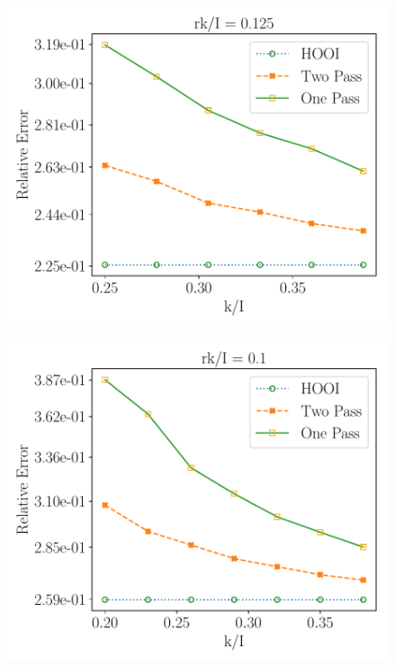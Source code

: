 \begin{figure}[H] 
    \centering 
    \begin{subfigure}{0.31\textwidth}
    \end{subfigure}
    \includegraphics[scale = 0.29]{figure/ABSORB_frk8.pdf}
    \begin{subfigure}{0.31\textwidth}
    \end{subfigure}
    \includegraphics[scale = 0.29]{figure/ABSORB_frk10.pdf}
    \begin{subfigure}{0.31\textwidth}

\end{subfigure}
\end{figure}
